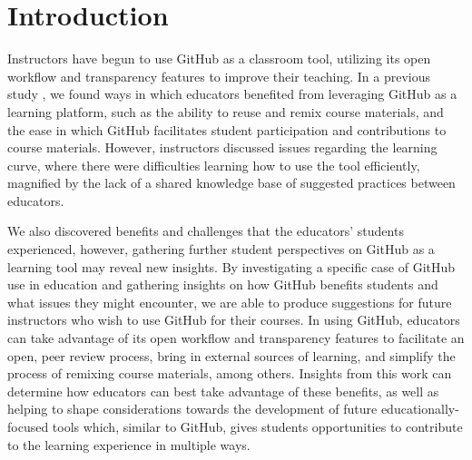 \section{Introduction}



Instructors have begun to use GitHub as a classroom tool, utilizing its open workflow and transparency features to improve their teaching. In a previous study \cite{zagalsky2015emergence}, we found ways in which educators benefited from leveraging GitHub as a learning platform, such as the ability to reuse and remix course materials, and the ease in which GitHub facilitates student participation and contributions to course materials. However, instructors discussed issues regarding the learning curve, where there were difficulties learning how to use the tool efficiently, magnified by the lack of a shared knowledge base of suggested practices between educators.

We also discovered benefits and challenges that the educators' students experienced, however, gathering further student perspectives on GitHub as a learning tool may reveal new insights. By investigating a specific case of GitHub use in education and gathering insights on how GitHub benefits students and what issues they might encounter, we are able to produce suggestions for future instructors who wish to use GitHub for their courses. In using GitHub, educators can take advantage of its open workflow and transparency features to facilitate an open, peer review process, bring in external sources of learning, and simplify the process of remixing course materials, among others. Insights from this work can determine how educators can best take advantage of these benefits, as well as helping to shape considerations towards the development of future educationally-focused tools which, similar to GitHub, gives students opportunities to contribute to the learning experience in multiple ways.



